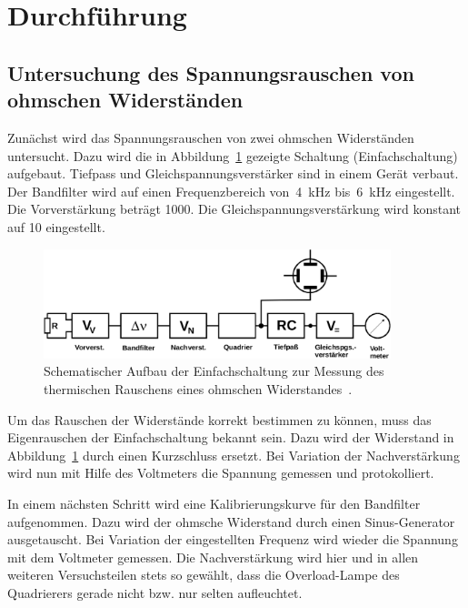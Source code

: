 \section{Durchführung}
\label{sec:durchführung}

\subsection{Untersuchung des Spannungsrauschen von ohmschen Widerständen}

Zunächst wird das Spannungsrauschen von zwei ohmschen Widerständen untersucht.
Dazu wird die in Abbildung~\ref{fig:aufbau_einfachschaltung} gezeigte Schaltung
(Einfachschaltung) aufgebaut. Tiefpass und Gleichspannungsverstärker sind in
einem Gerät verbaut. Der Bandfilter wird auf einen Frequenzbereich
von~\SI{4}{\kilo\hertz} bis~\SI{6}{\kilo\hertz} eingestellt. Die Vorverstärkung
beträgt 1000. Die Gleichspannungsverstärkung wird konstant auf 10 eingestellt.

\begin{figure}
  \centering
  \includegraphics[width=0.9\textwidth]{figures/aufbau_einfachschaltung.pdf}
  \caption{Schematischer Aufbau der Einfachschaltung zur Messung des thermischen
  Rauschens eines ohmschen Widerstandes~\cite{V57}.}
  \label{fig:aufbau_einfachschaltung}
\end{figure}

Um das Rauschen der Widerstände korrekt bestimmen zu können, muss das
Eigenrauschen der Einfachschaltung bekannt sein. Dazu wird der Widerstand in
Abbildung~\ref{fig:aufbau_einfachschaltung} durch einen Kurzschluss ersetzt. Bei
Variation der Nachverstärkung wird nun mit Hilfe des Voltmeters die Spannung
gemessen und protokolliert.

In einem nächsten Schritt wird eine Kalibrierungskurve für den Bandfilter
aufgenommen. Dazu wird der ohmsche Widerstand durch einen Sinus-Generator
ausgetauscht. Bei Variation der eingestellten Frequenz wird wieder die Spannung
mit dem Voltmeter gemessen. Die Nachverstärkung wird hier und in allen weiteren
Versuchsteilen stets so gewählt, dass die Overload-Lampe des Quadrierers gerade
nicht bzw. nur selten aufleuchtet.

